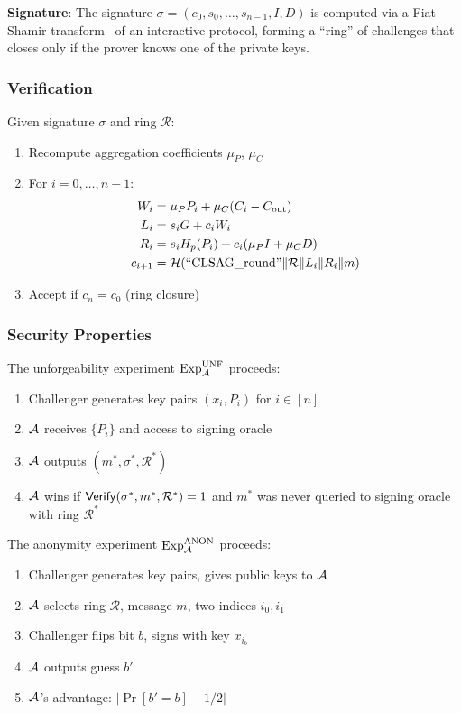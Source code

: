 \textbf{Signature}: The signature $\sigma = (c_0, s_0, \ldots, s_{n-1}, I, D)$
is computed via a Fiat-Shamir transform~\cite{fiatshamir} of an interactive protocol,
forming a ``ring'' of challenges that closes only if the prover knows
one of the private keys.

\subsubsection{Verification}

Given signature $\sigma$ and ring $\mathcal{R}$:
\begin{enumerate}
  \item Recompute aggregation coefficients $\mu_P$, $\mu_C$
  \item For $i = 0, \ldots, n-1$:
    \begin{align}
      W_i &= \mu_P P_i + \mu_C (C_i - C_{\text{out}}) \\
      L_i &= s_i G + c_i W_i \\
      R_i &= s_i H_p(P_i) + c_i (\mu_P I + \mu_C D) \\
      c_{i+1} &= \mathcal{H}(\text{``CLSAG\_round''} \| \mathcal{R} \| L_i \| R_i \| m)
    \end{align}
  \item Accept if $c_n = c_0$ (ring closure)
\end{enumerate}

\subsubsection{Security Properties}

\begin{definition}
The unforgeability experiment $\text{Exp}^{\text{UNF}}_{\mathcal{A}}$ proceeds:
\begin{enumerate}
  \item Challenger generates key pairs $(x_i, P_i)$ for $i \in [n]$
  \item $\mathcal{A}$ receives $\{P_i\}$ and access to signing oracle
  \item $\mathcal{A}$ outputs $(m^*, \sigma^*, \mathcal{R}^*)$
  \item $\mathcal{A}$ wins if $\mathsf{Verify}(\sigma^*, m^*, \mathcal{R}^*) = 1$ and
    $m^*$ was never queried to signing oracle with ring $\mathcal{R}^*$
\end{enumerate}
\end{definition}

\begin{definition}
The anonymity experiment $\text{Exp}^{\text{ANON}}_{\mathcal{A}}$ proceeds:
\begin{enumerate}
  \item Challenger generates key pairs, gives public keys to $\mathcal{A}$
  \item $\mathcal{A}$ selects ring $\mathcal{R}$, message $m$, two indices $i_0, i_1$
  \item Challenger flips bit $b$, signs with key $x_{i_b}$
  \item $\mathcal{A}$ outputs guess $b'$
  \item $\mathcal{A}$'s advantage: $|\Pr[b' = b] - 1/2|$
\end{enumerate}
\end{definition}


